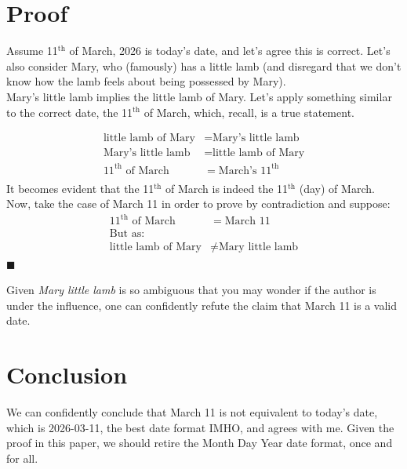 \documentclass[12pt]{article}
\begin{document}
\section{Proof}


Assume 11$^{\text{th}}$ of March, 2026 is today's date, and let's agree this is correct. Let's also consider Mary, who (famously) has a little lamb (and disregard that we don't know how the lamb feels about being possessed by Mary). \\

Mary's little lamb implies the little lamb of Mary. Let's apply something similar to the correct date, the 11$^{\text{th}}$ of March, which, recall, is a true statement.\\ 

\clearpage


\begin{align*} 
\text{little lamb of Mary} &=  \text{Mary's little lamb} \\
\text{Mary's little lamb}  &= \text{little lamb of Mary}\\
11^{\text{th}}  \text{ of March} &=  \text{March's } 11^{\text{th}}\\
\end{align*}
It becomes evident that the 11$^{\text{th}}$ of March is indeed the 11$^{\text{th}}$ (day) of March.\\

Now, take the case of March 11 in order to prove by contradiction and suppose: \\ 
\begin{align*}
11^{\text{th}}  \text{ of March} &= \text{March } 11   \\ 
\text{But as:} \\
\text{little lamb of Mary} &\neq  \text{Mary little lamb}
\end{align*}
\hfill $\blacksquare$

Given \emph{Mary little lamb} is so ambiguous that you may wonder if the author is under the influence, one can confidently refute the claim that March 11 is a valid date. 

\section{Conclusion}
 
We can confidently conclude that March 11 is not equivalent to today's date, which is 2026-03-11, the best date format IMHO, and \citeauthor{ISO8601} agrees with me. Given the proof in this paper, we should retire the Month Day Year date format, once and for all.
\end{document}
